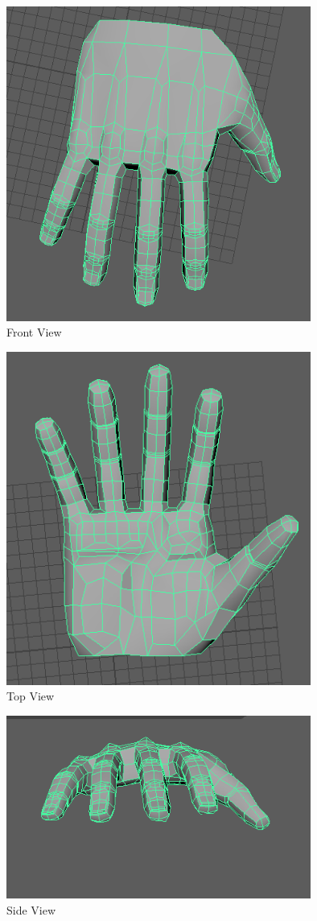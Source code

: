 \documentclass[a4paper]{article}
\begin{document}
\begin{figure}[h]
\centering
\includegraphics[width=10cm]{img/Front1.png}
\caption{Front View}
\label{fig:Front View}
\end{figure}

\begin{figure}[h]
\centering
\includegraphics[width=10cm]{img/Back1.png}
\caption{Top View}
\label{fig:Angle View}
\end{figure}


\begin{figure}[h]
\centering
\includegraphics[width=10cm]{img/Side1.png}
\caption{Side View}
\label{fig:Side View}
\end{figure}
\end{document}
